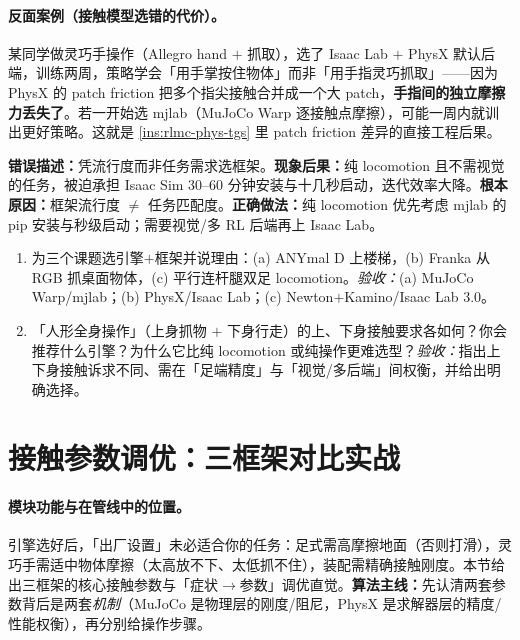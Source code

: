 \paragraph{反面案例（接触模型选错的代价）。}某同学做灵巧手操作（Allegro hand $+$ 抓取），选了 Isaac Lab $+$ PhysX 默认后端，训练两周，策略学会「用手掌按住物体」而非「用手指灵巧抓取」——因为 PhysX 的 patch friction 把多个指尖接触合并成一个大 patch，\textbf{手指间的独立摩擦力丢失了}。若一开始选 mjlab（MuJoCo Warp 逐接触点摩擦），可能一周内就训出更好策略。这就是 \cref{ins:rlmc-phys-tgs} 里 patch friction 差异的直接工程后果。

\begin{pitfall}
\textbf{错误描述：}凭流行度而非任务需求选框架。\textbf{现象后果：}纯 locomotion 且不需视觉的任务，被迫承担 Isaac Sim 30--60 分钟安装与十几秒启动，迭代效率大降。\textbf{根本原因：}框架流行度 $\neq$ 任务匹配度。\textbf{正确做法：}纯 locomotion 优先考虑 mjlab 的 pip 安装与秒级启动；需要视觉/多 RL 后端再上 Isaac Lab。
\end{pitfall}

\begin{practice}[本节练习]
\begin{enumerate}
  \item 为三个课题选引擎$+$框架并说理由：(a) ANYmal D 上楼梯，(b) Franka 从 RGB 抓桌面物体，(c) 平行连杆腿双足 locomotion。\emph{验收：}(a) MuJoCo Warp/mjlab；(b) PhysX/Isaac Lab；(c) Newton$+$Kamino/Isaac Lab 3.0。
  \item 「人形全身操作」（上身抓物 $+$ 下身行走）的上、下身接触要求各如何？你会推荐什么引擎？为什么它比纯 locomotion 或纯操作更难选型？\emph{验收：}指出上下身接触诉求不同、需在「足端精度」与「视觉/多后端」间权衡，并给出明确选择。
\end{enumerate}
\end{practice}

\section{接触参数调优：三框架对比实战}
\label{sec:rlmc-phys-tuning}

\paragraph{模块功能与在管线中的位置。}引擎选好后，「出厂设置」未必适合你的任务：足式需高摩擦地面（否则打滑），灵巧手需适中物体摩擦（太高放不下、太低抓不住），装配需精确接触刚度。本节给出三框架的核心接触参数与「症状$\to$参数」调优直觉。\textbf{算法主线：}先认清两套参数背后是两套\emph{机制}（MuJoCo 是物理层的刚度/阻尼，PhysX 是求解器层的精度/性能权衡），再分别给操作步骤。

